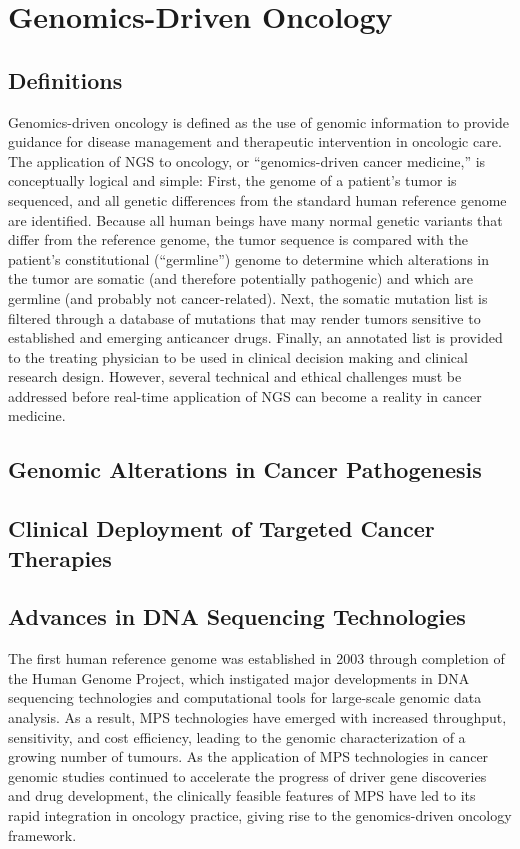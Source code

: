 \section{Genomics-Driven Oncology}
\label{sec:Genomics-DrivenOncology}

\subsection{Definitions}
Genomics-driven oncology is defined as the use of genomic information to provide guidance for disease management and therapeutic intervention in oncologic care. The application of NGS to oncology, or “genomics-driven cancer medicine,” is conceptually logical and simple: First, the genome of a patient’s tumor is sequenced, and all genetic differences from the standard human reference genome are identified. Because all human beings have many normal genetic variants that differ from the reference genome, the tumor sequence is compared with the patient’s constitutional (“germline”) genome to determine which alterations in the tumor are somatic (and therefore potentially pathogenic) and which are germline (and probably not cancer-related). Next, the somatic mutation list is filtered through a database of mutations that may render tumors sensitive to established and emerging anticancer drugs. Finally, an annotated list is provided to the treating physician to be used in clinical decision making and clinical research design. However, several technical and ethical challenges must be addressed before real-time application of NGS can become a reality in cancer medicine.

\subsection{Genomic Alterations in Cancer Pathogenesis}

\subsection{Clinical Deployment of Targeted Cancer Therapies}

\subsection{Advances in DNA Sequencing Technologies}

The first human reference genome was established in 2003 through completion of the Human Genome Project, which instigated major developments in DNA sequencing technologies and computational tools for large-scale genomic data analysis. As a result, MPS technologies have emerged with increased throughput, sensitivity, and cost efficiency, leading to the genomic characterization of a growing number of tumours. As the application of MPS technologies in cancer genomic studies continued to accelerate the progress of driver gene discoveries and drug development, the clinically feasible features of MPS have led to its rapid integration in oncology practice, giving rise to the genomics-driven oncology framework.

